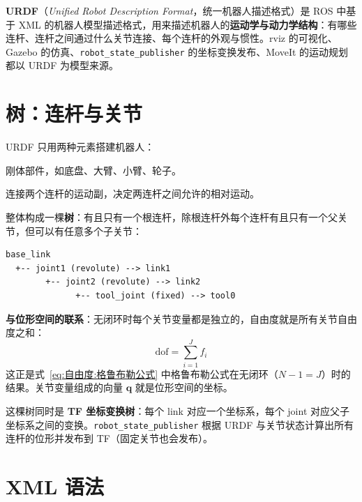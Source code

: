 
\textbf{URDF}（\textit{Unified Robot Description Format}，统一机器人描述格式）是 ROS 中基于 XML 的机器人模型描述格式，用来描述机器人的\textbf{运动学与动力学结构}：有哪些连杆、连杆之间通过什么关节连接、每个连杆的外观与惯性。rviz 的可视化、Gazebo 的仿真、\texttt{robot\_state\_publisher} 的坐标变换发布、MoveIt 的运动规划都以 URDF 为模型来源。

\section{树：连杆与关节}

URDF 只用两种元素搭建机器人：

\begin{definition}
	刚体部件，如底盘、大臂、小臂、轮子。
\end{definition}

\begin{definition}
	连接两个连杆的运动副，决定两连杆之间允许的相对运动。
\end{definition}

整体构成一棵\textbf{树}：有且只有一个根连杆，除根连杆外每个连杆有且只有一个父关节，但可以有任意多个子关节：
{\small
\begin{verbatim}
base_link
  +-- joint1 (revolute) --> link1
        +-- joint2 (revolute) --> link2
              +-- tool_joint (fixed) --> tool0
\end{verbatim}
}

\textbf{与位形空间的联系}：无闭环时每个关节变量都是独立的，自由度就是所有关节自由度之和：
\begin{equation}
	\label{eq:URDF:自由度}
	\mathrm{dof}=\sum_{i=1}^{J}f_{i}
\end{equation}
这正是式~\eqref{eq:自由度:格鲁布勒公式} 中格鲁布勒公式在无闭环（$N-1=J$）时的结果。关节变量组成的向量 $\boldsymbol{q}$ 就是位形空间的坐标。

这棵树同时是 \textbf{TF 坐标变换树}：每个 link 对应一个坐标系，每个 joint 对应父子坐标系之间的变换。\texttt{robot\_state\_publisher} 根据 URDF 与关节状态计算出所有连杆的位形并发布到 TF（固定关节也会发布）。

\section{XML 语法}

